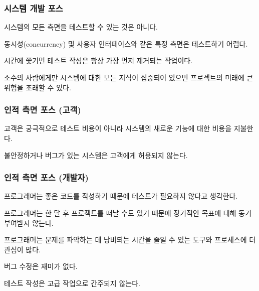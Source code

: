 \documentclass[a4paper,10pt,twoside]{book}
\begin{document}
\subsubsection*{시스템 개발 포스}

\begin{bulletlist}
\item 시스템의 모든 측면을 테스트할 수 있는 것은 아니다.

\item 동시성(concurrency) 및 사용자 인터페이스와 같은 특정 측면은 테스트하기 어렵다.

\item 시간에 쫓기면 테스트 작성은 항상 가장 먼저 제거되는 작업이다.

\item 소수의 사람에게만 시스템에 대한 모든 지식이 집중되어 있으면 프로젝트의 미래에 큰 위험을 초래할 수 있다.
\end{bulletlist}

\subsubsection*{인적 측면 포스 (고객)}

\begin{bulletlist}
\item 고객은 궁극적으로 테스트 비용이 아니라 시스템의 새로운 기능에 대한 비용을 지불한다.

\item 불안정하거나 버그가 있는 시스템은 고객에게 허용되지 않는다.
\end{bulletlist}

\subsubsection*{인적 측면 포스 (개발자)}

\begin{bulletlist}
\item 프로그래머는 좋은 코드를 작성하기 때문에 테스트가 필요하지 않다고 생각한다. 

\item 프로그래머는 한 달 후 프로젝트를 떠날 수도 있기 때문에 장기적인 목표에 대해 동기 부여받지 않는다. 

\item 프로그래머는 문제를 파악하는 데 낭비되는 시간을 줄일 수 있는 도구와 프로세스에 더 관심이 많다.

\item 버그 수정은 재미가 없다.

\item 테스트 작성은 고급 작업으로 간주되지 않는다.
\end{bulletlist}
\end{document}
